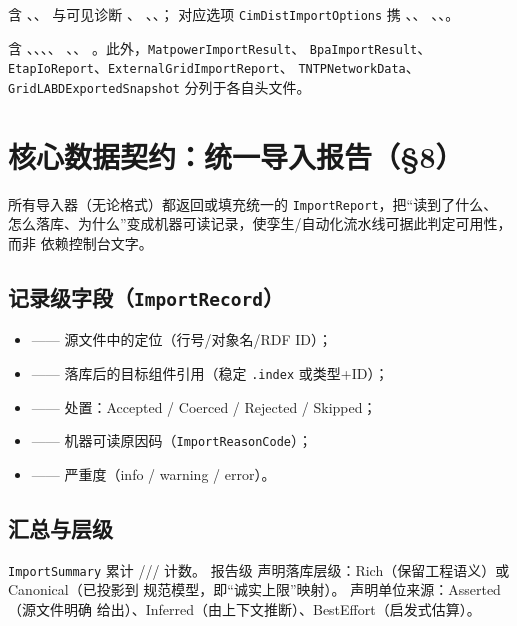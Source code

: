 \documentclass[UTF8,fontset=fandol,a4paper,11pt]{ctexart}
\begin{document}
含 、、 与可见诊断 、
、、；
对应选项 \texttt{CimDistImportOptions} 携 、、
、、。

含 、、、、
、、
。此外，\texttt{MatpowerImportResult}、
\texttt{BpaImportResult}、\texttt{EtapIoReport}、\texttt{ExternalGridImportReport}、
\texttt{TNTPNetworkData}、\texttt{GridLABDExported\allowbreak Snapshot} 分列于各自头文件。




\section{核心数据契约：统一导入报告（§8）}
所有导入器（无论格式）都返回或填充统一的 \texttt{ImportReport}，把“读到了什么、
怎么落库、为什么”变成机器可读记录，使孪生/自动化流水线可据此判定可用性，而非
依赖控制台文字。

\subsection{记录级字段（\texttt{ImportRecord}）}
\begin{itemize}
  \item {} —— 源文件中的定位（行号/对象名/RDF ID）；
  \item {} —— 落库后的目标组件引用（稳定 \texttt{.index} 或类型+ID）；
  \item {} —— 处置：Accepted / Coerced / Rejected / Skipped；
  \item {} —— 机器可读原因码（\texttt{ImportReasonCode}）；
  \item {} —— 严重度（info / warning / error）。
\end{itemize}

\subsection{汇总与层级}
\texttt{ImportSummary} 累计 /// 计数。
报告级  声明落库层级：Rich（保留工程语义）或 Canonical（已投影到
规范模型，即“诚实上限”映射）。 声明单位来源：Asserted（源文件明确
给出）、Inferred（由上下文推断）、BestEffort（启发式估算）。
\end{document}
